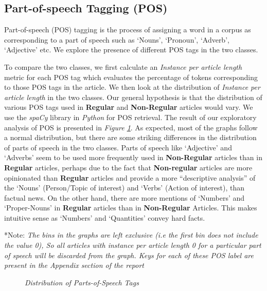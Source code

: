 \documentclass[11pt]{article}
\begin{document}
\subsection{Part-of-speech Tagging (POS)}

Part-of-speech (POS) tagging is the process of assigning a word in a corpus as corresponding to a part of speech such as `Nouns', `Pronoun', `Adverb', `Adjective' etc. We explore the presence of different POS tags in the two classes.

To compare the two classes, we first calculate an \textit{Instance per article length} metric for each POS tag which evaluates the percentage of tokens corresponding to those POS tags in the article. We then look at the distribution of \textit{Instance per article length} in the two classes. Our general hypothesis is that the distribution of various POS tags used in \textbf{Regular} and \textbf{Non-Regular} articles would vary. We use the \textit{spaCy} library in \textit {Python} for POS retrieval. The result of our exploratory analysis of POS is presented in \textit{Figure \ref{fig:pos}}. As expected, most of the graphs follow a normal distribution, but there are some striking differences in the distribution of parts of speech in the two classes. Parts of speech like `Adjective' and `Adverbs' seem to be used more frequently used in \textbf{Non-Regular} articles than in \textbf{Regular} articles, perhaps due to the fact that \textbf{Non-regular} articles are more opinionated than \textbf{Regular} articles and provide a more “descriptive analysis” of the `Nouns' (Person/Topic of interest) and `Verbs' (Action of interest), than factual news.  On the other hand, there are more mentions of `Numbers' and `Proper-Nouns' in \textbf{Regular} articles than in \textbf{Non-Regular} Articles. This makes intuitive sense as `Numbers' and `Quantities' convey hard facts.

\medskip
*Note: \textit{The bins in the graphs are left exclusive (i.e the first bin does not include the value 0), So all articles with instance per article length 0 for a particular part of speech will be discarded from the graph. Keys for each of these POS label are present in the Appendix section of the report}

\begin{figure}[!htb]
\caption{\label{fig:pos} \textit{Distribution of Parts-of-Speech Tags}}
\end{figure}
\end{document}
